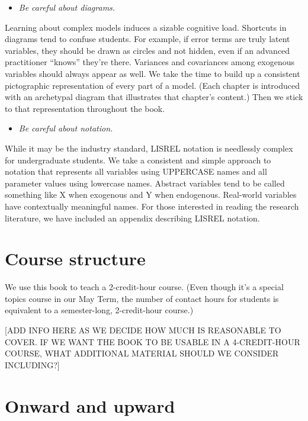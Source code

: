 \documentclass[
]{book}
\providecommand{\tightlist}{%
  \setlength{\itemsep}{0pt}\setlength{\parskip}{0pt}}
\begin{document}
\begin{itemize}
\tightlist
\item
  \emph{Be careful about diagrams.}
\end{itemize}

Learning about complex models induces a sizable cognitive load. Shortcuts in diagrams tend to confuse students. For example, if error terms are truly latent variables, they should be drawn as circles and not hidden, even if an advanced practitioner ``knows'' they're there. Variances and covariances among exogenous variables should always appear as well. We take the time to build up a consistent pictographic representation of every part of a model. (Each chapter is introduced with an archetypal diagram that illustrates that chapter's content.) Then we stick to that representation throughout the book.

\begin{itemize}
\tightlist
\item
  \emph{Be careful about notation.}
\end{itemize}

While it may be the industry standard, LISREL notation is needlessly complex for undergraduate students. We take a consistent and simple approach to notation that represents all variables using UPPERCASE names and all parameter values using lowercase names. Abstract variables tend to be called something like X when exogenous and Y when endogenous. Real-world variables have contextually meaningful names. For those interested in reading the research literature, we have included an appendix describing LISREL notation.

\hypertarget{intro-structure}{%
\section*{Course structure}\label{intro-structure}}

We use this book to teach a 2-credit-hour course. (Even though it's a special topics course in our May Term, the number of contact hours for students is equivalent to a semester-long, 2-credit-hour course.)

{[}ADD INFO HERE AS WE DECIDE HOW MUCH IS REASONABLE TO COVER. IF WE WANT THE BOOK TO BE USABLE IN A 4-CREDIT-HOUR COURSE, WHAT ADDITIONAL MATERIAL SHOULD WE CONSIDER INCLUDING?{]}

\hypertarget{intro-onward}{%
\section*{Onward and upward}\label{intro-onward}}
\end{document}
